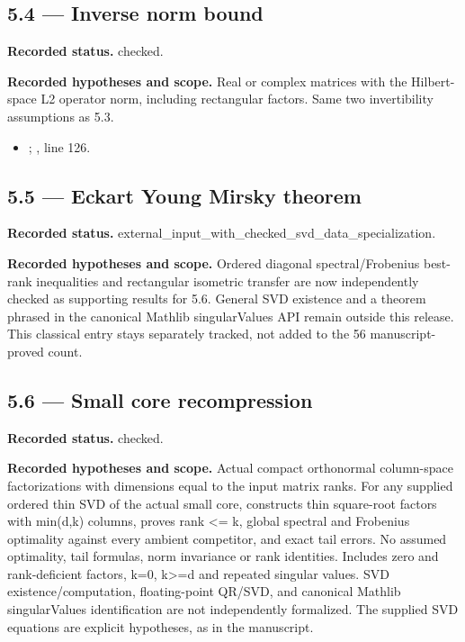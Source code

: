 \subsection{5.4 — Inverse norm bound}
\label{result:5.4}
\textbf{Recorded status.} checked.

\textbf{Recorded hypotheses and scope.} Real or complex matrices with the Hilbert-space L2 operator norm, including rectangular factors. Same two invertibility assumptions as 5.3.

\begin{itemize}
\item {}; , line 126.
\end{itemize}
\subsection{5.5 — Eckart Young Mirsky theorem}
\label{result:5.5}
\textbf{Recorded status.} external\_input\_with\_checked\_svd\_data\_specialization.

\textbf{Recorded hypotheses and scope.} Ordered diagonal spectral/Frobenius best-rank inequalities and rectangular isometric transfer are now independently checked as supporting results for 5.6. General SVD existence and a theorem phrased in the canonical Mathlib singularValues API remain outside this release. This classical entry stays separately tracked, not added to the 56 manuscript-proved count.

\subsection{5.6 — Small core recompression}
\label{result:5.6}
\textbf{Recorded status.} checked.

\textbf{Recorded hypotheses and scope.} Actual compact orthonormal column-space factorizations with dimensions equal to the input matrix ranks. For any supplied ordered thin SVD of the actual small core, constructs thin square-root factors with min(d,k) columns, proves rank <= k, global spectral and Frobenius optimality against every ambient competitor, and exact tail errors. No assumed optimality, tail formulas, norm invariance or rank identities. Includes zero and rank-deficient factors, k=0, k>=d and repeated singular values. SVD existence/computation, floating-point QR/SVD, and canonical Mathlib singularValues identification are not independently formalized. The supplied SVD equations are explicit hypotheses, as in the manuscript.

